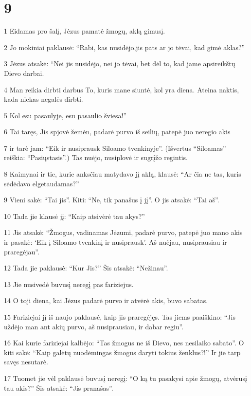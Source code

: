 \chapter{9}


\par 1 Eidamas pro šalį, Jėzus pamatė žmogų, aklą gimusį. 
\par 2 Jo mokiniai paklausė: “Rabi, kas nusidėjo,­jis pats ar jo tėvai,­ kad gimė aklas?” 
\par 3 Jėzus atsakė: “Nei jis nusidėjo, nei jo tėvai, bet dėl to, kad jame apsireikštų Dievo darbai. 
\par 4 Man reikia dirbti darbus To, kuris mane siuntė, kol yra diena. Ateina naktis, kada niekas negalės dirbti. 
\par 5 Kol esu pasaulyje, esu pasaulio šviesa!” 
\par 6 Tai taręs, Jis spjovė žemėn, padarė purvo iš seilių, patepė juo neregio akis 
\par 7 ir tarė jam: “Eik ir nusiprausk Siloamo tvenkinyje”. (Išvertus “Siloamas” reiškia: “Pasiųstasis”.) Tas nuėjo, nusiplovė ir sugrįžo regintis. 
\par 8 Kaimynai ir tie, kurie anksčiau matydavo jį aklą, klausė: “Ar čia ne tas, kuris sėdėdavo elgetaudamas?” 
\par 9 Vieni sakė: “Tai jis”. Kiti: “Ne, tik panašus į jį”. O jis atsakė: “Tai aš”. 
\par 10 Tada jie klausė jį: “Kaip atsivėrė tau akys?” 
\par 11 Jis atsakė: “Žmogus, vadinamas Jėzumi, padarė purvo, patepė juo mano akis ir pasakė: ‘Eik į Siloamo tvenkinį ir nusiprausk’. Aš nuėjau, nusiprausiau ir praregėjau”. 
\par 12 Tada jie paklausė: “Kur Jis?” Šis atsakė: “Nežinau”. 
\par 13 Jie nusivedė buvusį neregį pas fariziejus. 
\par 14 O toji diena, kai Jėzus padarė purvo ir atvėrė akis, buvo sabatas. 
\par 15 Fariziejai jį iš naujo paklausė, kaip jis praregėjęs. Tas jiems paaiškino: “Jis uždėjo man ant akių purvo, aš nusiprausiau, ir dabar regiu”. 
\par 16 Kai kurie fariziejai kalbėjo: “Tas žmogus ne iš Dievo, nes nesilaiko sabato”. O kiti sakė: “Kaip galėtų nuodėmingas žmogus daryti tokius ženklus?!” Ir jie tarp savęs nesutarė. 
\par 17 Tuomet jie vėl paklausė buvusį neregį: “O ką tu pasakysi apie žmogų, atvėrusį tau akis?” Šis atsakė: “Jis pranašas”. 
